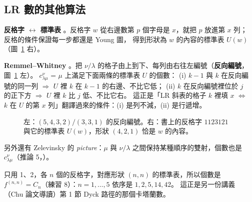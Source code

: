 \subsection{LR 數的其他算法}\label{sec:f-lrother}

\textbf{反格字 $\leftrightarrow$ 標準表} 。反格字 $w$ 從右邊數第 $p$ 個字母是 $x$，就把 $p$ 放進第 $x$ 列；反格的條件保證每一步都還是 Young 圖，
得到形狀為 $w$ 的內容的標準表 $U(w)$（圖~\ref{fig:f-rw} 右）。

\textbf{Remmel–Whitney} 。把 $\nu/\lambda$ 的格子由上到下、每列由右往左編號（\textbf{反向編號}，圖~\ref{fig:f-rw} 左）。
$c^\nu_{\lambda\mu}$ = $\mu$ 上滿足下面兩條的標準表 $U$ 的個數：
(i) $k-1$ 與 $k$ 在反向編號的同一列 $\Rightarrow$ $U$ 裡 $k$ 在 $k-1$ 的右邊、不比它低；
(ii) $k$ 在反向編號裡位於 $j$ 的正下方 $\Rightarrow$ $U$ 裡 $k$ 比 $j$ 低、不比它右。
這正是「LR 斜表的格子 $k$ 裡填 $x$ $\iff$ $k$ 在 $U$ 的第 $x$ 列」翻譯過來的條件：(i) 是列不減，(ii) 是行遞增。

\begin{figure}[H]
\centering
\FulRW
\caption{左：$(5,4,3,2)/(3,3,1)$ 的反向編號。右：書上的反格字 $1123121$ 與它的標準表 $U(w)$，形狀 $(4,2,1)$ 恰是 $w$ 的內容。}
\label{fig:f-rw}
\end{figure}

\begin{table}[H]
\centering
\FulRWTable
\caption{對每個 $\mu$，把 $\mu$ 上所有標準表拿來檢查 (i)(ii)：189 個裡恰有 15 個過關，各 $\mu$ 的個數正是圖~\ref{fig:f-lrall} 的 $c^\nu_{\lambda\mu}$。}
\label{tab:f-rw}
\end{table}

另外還有 Zelevinsky 的 \emph{picture}：$\mu$ 與 $\nu/\lambda$ 之間保持某種順序的雙射，個數也是 $c^\nu_{\lambda\mu}$（推論 5，）。

\begin{notebox}[彩蛋：回到卡塔蘭數]
只用 1、2，各 $n$ 個的反格字，對應形狀 $(n,n)$ 的標準表，所以個數是 $f^{(n,n)}=C_n$（練習 8）：$n=1,\ldots,5$ 依序是 $1,2,5,14,42$。
這正是另一份講義（Chu 論文導讀）第 1 節 Dyck 路徑的那個卡塔蘭數。
\end{notebox}
